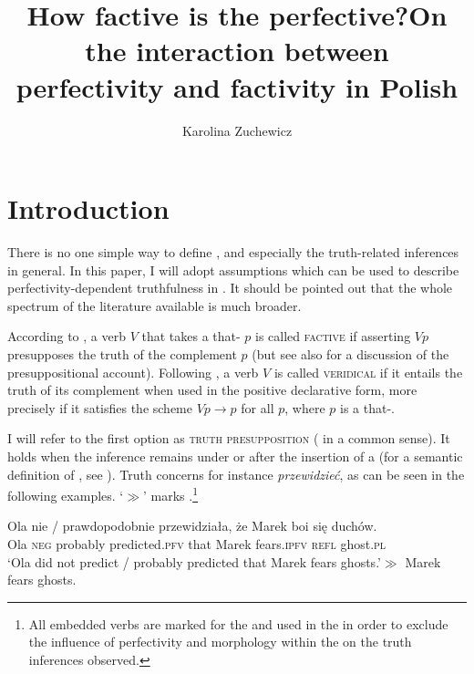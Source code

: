 \documentclass[output=paper,  modfonts,  newtxmath,  hidelinks		  ]{langscibook}
\title{How factive is the perfective?\newlineCover On the interaction between perfectivity and factivity in Polish}
\author{Karolina Zuchewicz\affiliation{Leibniz-Zentrum Allgemeine Sprachwissenschaft \&\\Humboldt-Universität zu Berlin}}
\begin{document}
\maketitle
{}

\section{Introduction}\label{21:intro}

There is no one simple way to define , and especially the truth-related inferences in general. In this paper, I will adopt assumptions which can be used to describe perfectivity-dependent truthfulness in . It should be pointed out that the whole spectrum of the literature available is much broader.

According to \cite{KiparskyKiparsky1970}, a verb $V$ that takes a that- $p$ is called \textsc{factive} if asserting $\mathit{V\!p}$ presupposes the truth of the complement $p$ (but see also \citealt{Karttunen1971} for a discussion of the presuppositional account). Following \citet[101]{Egré2008}, a verb $V$ is called \textsc{veridical} if it entails the truth of its complement when used in the positive declarative form, more precisely if it satisfies the scheme $\mathit{V\!p}{}\rightarrow{}p$ for all $p$, where $p$ is a that-.

I will refer to the first option as \textsc{truth presupposition} ( in a common sense). It holds when the inference remains under  or after the insertion of a  (for a semantic definition of , see \citealt{Strawson1950}). Truth  concerns for instance  \textit{przewidzieć}, as can be seen in the following examples. ‘$\gg$’ marks .\footnote{All embedded verbs are marked for the  and used in the  in order to exclude the influence of perfectivity and  morphology within the  on the truth inferences observed.}

\ea\label{21:1} 
\gll Ola nie / prawdopodobnie przewidziała, że Marek boi się duchów.\\
    Ola \textsc{neg} {} probably predicted.\textsc{pfv} that Marek fears.\textsc{ipfv} \textsc{refl} ghost.\textsc{pl}\\
\glt	 `Ola did not predict / probably predicted that Marek fears ghosts.'\newline$\gg$ Marek fears ghosts.
\z
\end{document}
